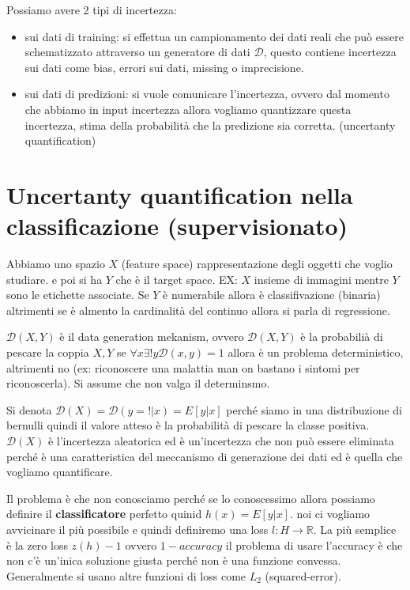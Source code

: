 Possiamo avere 2 tipi di incertezza:
\begin{itemize}
    \item sui dati di training: si effettua un campionamento dei dati reali che può essere schematizzato attraverso un 
    generatore di dati $\mathcal{D}$, questo contiene incertezza sui dati come bias, errori sui dati, missing o imprecisione.
    \item sui dati di predizioni: si vuole comunicare l'incertezza, ovvero dal momento che abbiamo in input incertezza allora vogliamo 
    quantizzare questa incertezza, stima della probabilità che la predizione sia corretta. (uncertanty quantification)
\end{itemize}





\section*{Uncertanty quantification nella classificazione (supervisionato)}

Abbiamo uno spazio $X$ (feature space) rappresentazione degli oggetti che voglio studiare. e poi si ha $Y$ che è il target space. EX:
$X$ insieme di immagini mentre $Y$ sono le etichette associate. Se $Y$ è numerabile allora è classifivazione (binaria) altrimenti se è almento la 
cardinalità del continuo allora si parla di regressione.

$\mathcal{D}(X, Y)$ è il data generation mekanism, ovvero $\mathcal{D}(X, Y)$ è la probabilià di pescare la coppia $X,Y$ se $\forall x \exists !y\mathcal{D}(x,y)=1$
allora è un problema deterministico, altrimenti no (ex: riconoscere una malattia man on bastano i sintomi per riconoscerla). Si assume 
che non valga il determinsmo.

Si denota $\mathcal{D}(X)=\mathcal{D}(y=!|x) = E[y|x]$ perché siamo in una distribuzione di bernulli quindi il valore atteso è la probabilità 
di pescare la classe positiva. $\mathcal{D}(X)$ è l'incertezza aleatorica ed è un'incertezza che non può essere eliminata perché è una caratteristica
del meccanismo di generazione dei dati ed è quella che vogliamo quantificare. 

Il problema è che non conosciamo perché se lo conoscessimo allora possiamo definire il \textbf{classificatore}
perfetto quinid $h(x)=E[y|x]$. noi ci vogliamo avvicinare il più possibile e quindi definiremo una loss $l:H\to \mathbb{R}$.
La più semplice è la zero loss  $z(h)-1$ ovvero $1-accuracy$ il problema di usare l'accuracy è che non c'è un'inica soluzione giusta 
perché non è una funzione convessa. Generalmente si usano altre funzioni di loss come $L_2$ (squared-error).

